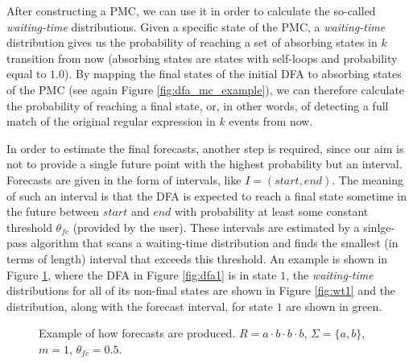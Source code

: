 After constructing a PMC, we can use it in order to calculate the so-called \textit{waiting-time} distributions.
Given a specific state of the PMC, a \textit{waiting-time} distribution gives us the probability of reaching a set of absorbing states in $k$ transition from now (absorbing states are states with self-loops and probability equal to $1.0$).
By mapping the final states of the initial DFA to absorbing states of the PMC
(see again Figure \ref{fig:dfa_mc_example}),
we can therefore calculate the probability of reaching a final state,
or, in other words, of detecting a full match of the original regular expression in $k$ events from now.

In order to estimate the final forecasts, another step is required,
since our aim is not to provide a single future point with the highest probability but an interval. 
Forecasts are given in the form of intervals, like $I=(\mathit{start},\mathit{end})$. 
The meaning of such an interval is that the DFA is expected to reach a final state sometime in the future between $\mathit{start}$ and $\mathit{end}$ with probability at least some constant threshold $\theta_{fc}$ (provided by the user). 
These intervals are estimated by a sinlge-pass algorithm that scans a waiting-time distribution and finds the smallest (in terms of length) interval that exceeds this threshold. 
An example is shown in Figure \ref{fig:wtdfas},
where the DFA in Figure \ref{fig:dfa1} is in state $1$,
the \textit{waiting-time} distributions for all of its non-final states are shown in Figure \ref{fig:wt1}
and the distribution, along with the forecast interval, for state $1$ are shown in green.
\begin{figure}[!ht]
\begin{centering}
\caption{Example of how forecasts are produced. 
$R=a\cdot b\cdot b\cdot b$, $\Sigma=\{a,b\}$, $m=1$, $\theta_{\mathit{fc}}=0.5$.}
\label{fig:wtdfas}
\end{centering}
\end{figure}

